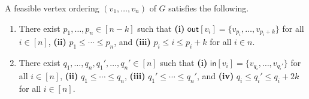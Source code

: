 \begin{observation} \label{obs-vertex}
    A feasible vertex ordering $(v_1,\dots,v_n)$ of $G$ satisfies the following.
    \begin{enumerate}
        \item There exist $p_1,\dots,p_n \in [n-k]$ such that \textnormal{\bf (i)} $\mathsf{out}[v_i] = \{v_{p_i},\dots,v_{p_i+k}\}$ for all $i \in [n]$, \textnormal{\bf (ii)} $p_1 \leq \cdots \leq p_n$, and \textnormal{\bf (iii)} $p_i \leq i \leq p_i+k$ for all $i \in n$.
        \item There exist $q_1,\dots,q_n,q_1',\dots,q_n' \in [n]$ such that \textnormal{\bf (i)} $\mathsf{in}[v_i] = \{v_{q_i},\dots,v_{q_i'}\}$ for all $i \in [n]$, \textnormal{\bf (ii)} $q_1 \leq \cdots \leq q_n$, \textnormal{\bf (iii)} $q_1' \leq \cdots \leq q_n'$, and \textnormal{\bf (iv)} $q_i \leq q_i' \leq q_i+2k$ for all $i \in [n]$.
    \end{enumerate}
\end{observation}
